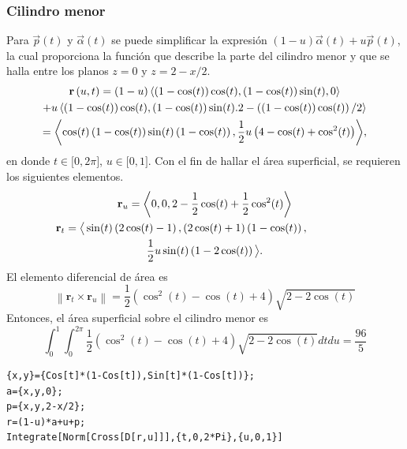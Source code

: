 \subsubsection{Cilindro menor}
Para $\overrightarrow{p}(t)$ y $\overrightarrow{\alpha }(t)$ se puede simplificar la expresión
$(1-u)\overrightarrow{\alpha }(t)+u\overrightarrow{p}(t)$,
la cual proporciona la función que describe la parte del cilindro menor y que se halla entre los planos $z=0$ y $z=2-x/2$.
\begin{multline*}
{\bf r}\left( u,t\right) = \left( 1-u\right) \left\langle \left( 1-\cos (t) \right) \cos
(t) ,\left( 1-\cos (t) \right) \sin (t),0\right\rangle \\
+u\left\langle \left( 1-\cos (t) \right) \cos (t) ,\left( 1-\cos (t) \right) \sin (t).
2-\left( \left( 1-\cos (t) \right) \cos (t) \right)
/2\right\rangle \\
=\left\langle \cos (t) \left( 1-\cos (t) \right)
\sin (t) \left( 1-\cos (t) \right) ,\frac{1}{2}u\left( 4-\cos (t) +\cos ^{2}(t) \right)
\right\rangle\!,
\end{multline*}
en donde $t\in \lbrack 0,2\pi ]$, $u\in \lbrack 0,1]$.
Con el fin de hallar el área superficial, se requieren los siguientes elementos.
\begin{multline*}
{\bf r}_{u}= \left \langle 0,0,2-\frac{1}{2}\cos (t) +\frac{1}{2}\cos ^{2}(t) \right \rangle \\
{\bf r}_{t}= \big\langle \sin (t) \left( 2\cos (t) -1\right) ,\left( 2\cos (t) +1\right) \left( 1-\cos (t) \right) , \hskip1.5cm \\ \frac{1}{2}u\sin (t) \left( 1-2\cos (t) \right) \big\rangle.
\end{multline*}
El elemento diferencial de área es
\begin{equation}
\left\| \mathbf{r}_{t}\times \mathbf{r}_{u}\right\| = \frac{1}{2}\left( \cos ^{2}(t) -\cos (t) +4\right) \sqrt{2-2\cos (t)}
\end{equation}
Entonces, el área superficial sobre el cilindro menor es
\begin{equation}
\int_{0}^{1}\int_{0}^{2\pi }\frac{1}{2}\left(\cos ^{2}(t)
-\cos (t) +4\right) \sqrt{2-2\cos (t)}dtdu= \frac{96}{5}
\end{equation}

\begin{tcolorbox}[title=\bf Instrucción en \verb"Mathematica"]\begin{Verbatim}[formatcom=\letraverbatim]
{x,y}={Cos[t]*(1-Cos[t]),Sin[t]*(1-Cos[t])};
a={x,y,0};
p={x,y,2-x/2};
r=(1-u)*a+u+p;
Integrate[Norm[Cross[D[r,u]]],{t,0,2*Pi},{u,0,1}]
\end{Verbatim}
\end{tcolorbox}

